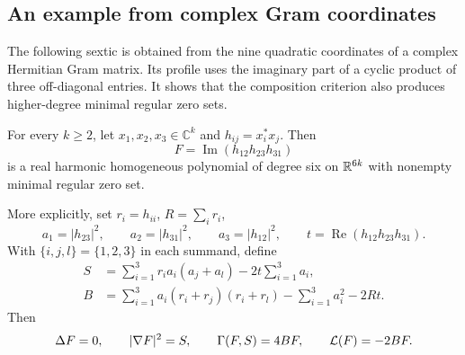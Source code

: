 \subsection{An example from complex Gram coordinates}
\label{sec:gram-composition-constructions}

The following sextic is obtained from the nine quadratic coordinates
of a complex Hermitian Gram matrix. Its profile uses the imaginary
part of a cyclic product of three off-diagonal entries. It shows
that the composition criterion also produces higher-degree minimal
regular zero sets.

\begin{example}
\label{thm:complex-gram-cycle-sextic}
For every $k\ge2$, let $x_1,x_2,x_3\in\mathbb C^k$ and
$h_{ij}=x_i^*x_j$.  Then
\begin{equation}\label{eq:complex-gram-cycle-sextic}
 F=\operatorname{Im}(h_{12}h_{23}h_{31})
\end{equation}
is a real harmonic homogeneous polynomial of degree six on $\mathbb R^{6k}$
with nonempty minimal regular zero set.

More explicitly, set $r_i=h_{ii}$, $R=\sum_i r_i$,
\[
 a_1=|h_{23}|^2,\qquad a_2=|h_{31}|^2,\qquad
 a_3=|h_{12}|^2,\qquad
 t=\operatorname{Re}(h_{12}h_{23}h_{31}).
\]
With $\{i,j,l\}=\{1,2,3\}$ in each summand, define
\begin{align}
 S&=\sum_{i=1}^3 r_i a_i(a_j+a_l)-2t\sum_{i=1}^3a_i,
 \label{eq:complex-gram-cycle-gradient}\\
 B&=\sum_{i=1}^3a_i(r_i+r_j)(r_i+r_l)
       -\sum_{i=1}^3a_i^2-2Rt.
 \label{eq:complex-gram-cycle-weight}
\end{align}
Then
\begin{equation}\label{eq:complex-gram-cycle-minimality}
 \Delta F=0,\qquad |\nabla F|^2=S,\qquad
 \Gamma(F,S)=4BF,\qquad \mathcal L(F)=-2BF.
\end{equation}
\end{example}

